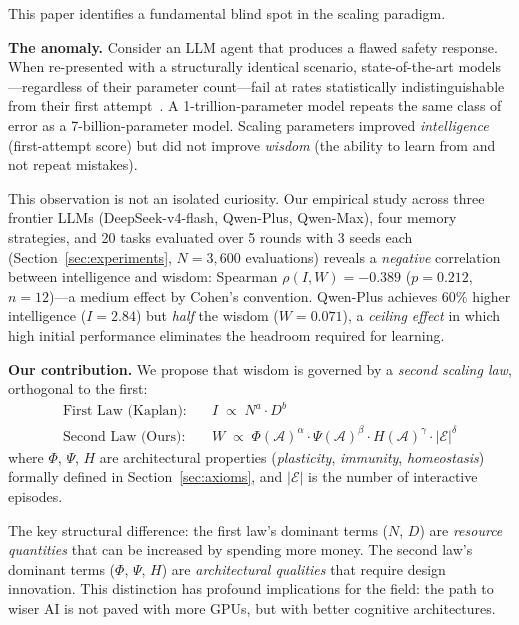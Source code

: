 \documentclass{article}
\newcommand{\cA}{\mathcal{A}}
\newcommand{\cE}{\mathcal{E}}
\begin{document}
This paper identifies a fundamental blind spot in the scaling paradigm.

\textbf{The anomaly.}
Consider an LLM agent that produces a flawed safety response.
When re-presented with a structurally identical scenario, state-of-the-art models---regardless of their parameter count---fail at rates statistically indistinguishable from their first attempt~\citep{madaan2023selfrefine, shinn2023reflexion}.
A 1-trillion-parameter model repeats the same class of error as a 7-billion-parameter model.
Scaling parameters improved \emph{intelligence} (first-attempt score) but did not improve \emph{wisdom} (the ability to learn from and not repeat mistakes).

This observation is not an isolated curiosity.
Our empirical study across three frontier LLMs (DeepSeek-v4-flash, Qwen-Plus, Qwen-Max), four memory strategies, and 20 tasks evaluated over 5 rounds with 3 seeds each (Section~\ref{sec:experiments}, $N{=}3{,}600$ evaluations) reveals a \emph{negative} correlation between intelligence and wisdom: Spearman $\rho(I, W) = -0.389$ ($p = 0.212$, $n{=}12$)---a medium effect by Cohen's convention.
Qwen-Plus achieves 60\% higher intelligence ($I{=}2.84$) but \emph{half} the wisdom ($W{=}0.071$), a \emph{ceiling effect} in which high initial performance eliminates the headroom required for learning.

\textbf{Our contribution.}
We propose that wisdom is governed by a \emph{second scaling law}, orthogonal to the first:
\begin{align}
\text{First Law (Kaplan):} \quad & I \;\propto\; N^{a} \cdot D^{b} \label{eq:first_law} \\
\text{Second Law (Ours):} \quad & W \;\propto\; \Phi(\cA)^{\alpha} \cdot \Psi(\cA)^{\beta} \cdot H(\cA)^{\gamma} \cdot |\cE|^{\delta} \label{eq:second_law}
\end{align}
where $\Phi$, $\Psi$, $H$ are architectural properties (\emph{plasticity}, \emph{immunity}, \emph{homeostasis}) formally defined in Section~\ref{sec:axioms}, and $|\cE|$ is the number of interactive episodes.

The key structural difference: the first law's dominant terms ($N$, $D$) are \emph{resource quantities} that can be increased by spending more money.
The second law's dominant terms ($\Phi$, $\Psi$, $H$) are \emph{architectural qualities} that require design innovation.
This distinction has profound implications for the field: the path to wiser AI is not paved with more GPUs, but with better cognitive architectures.
\end{document}
